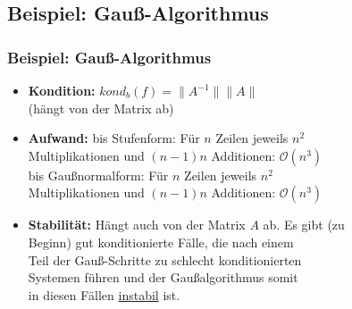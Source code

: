 \subsection{Beispiel: Gauß-Algorithmus}
%
\begin{frame}\frametitle{Beispiel: Gauß-Algorithmus}
\begin{itemize}
\item[] \textbf{Kondition:} $kond_b(f)=\|A^{-1}\|\|A\|$ \\ \hspace{19mm} (hängt von der Matrix ab) \pause \vfill
\item[] \textbf{Aufwand:} bis Stufenform: Für $n$ Zeilen jeweils $n^2$\\\hspace{16.5mm} Multiplikationen und $(n-1)n$ Additionen: $\mathcal O(n^3)$\\
\hspace{16.5mm} bis Gaußnormalform: Für $n$ Zeilen jeweils $n^2$\\\hspace{16.5mm} Multiplikationen und $(n-1)n$ Additionen: $\mathcal O(n^3)$\\\pause\vfill
\item[] \textbf{Stabilität:} Hängt auch von der Matrix $A$ ab. Es gibt (zu\\
\hspace{17.5mm} Beginn) gut konditionierte Fälle, die nach einem\\
\hspace{17.5mm} Teil der Gauß-Schritte zu schlecht konditionierten\\
\hspace{17.5mm} Systemen führen und der Gaußalgorithmus somit\\
\hspace{17.5mm} in diesen Fällen \underline{instabil} ist.
\end{itemize}
\end{frame}
%
%
